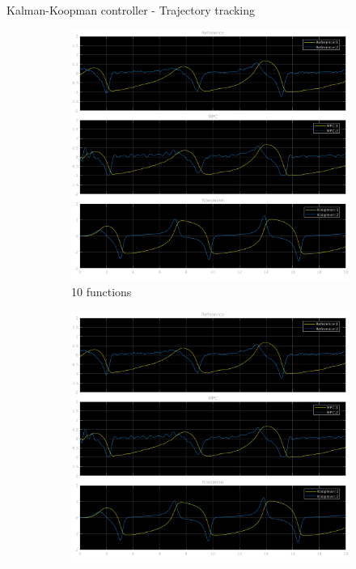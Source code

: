 \documentclass{beamer}
\begin{document}
\begin{frame}{Kalman-Koopman controller - Trajectory tracking}
    \begin{figure}
        \centering
        \begin{subfigure}[b]{0.3\textwidth}
            \centering
            \includegraphics[width=\textwidth]{KK_10_Ref.png}
            \caption{10 functions}
        \end{subfigure}
        \hfill
        \begin{subfigure}[b]{0.3\textwidth}
            \centering
            \includegraphics[width=\textwidth]{KK_20_Ref.png}

\end{subfigure}
\end{figure}
\end{frame}
\end{document}
